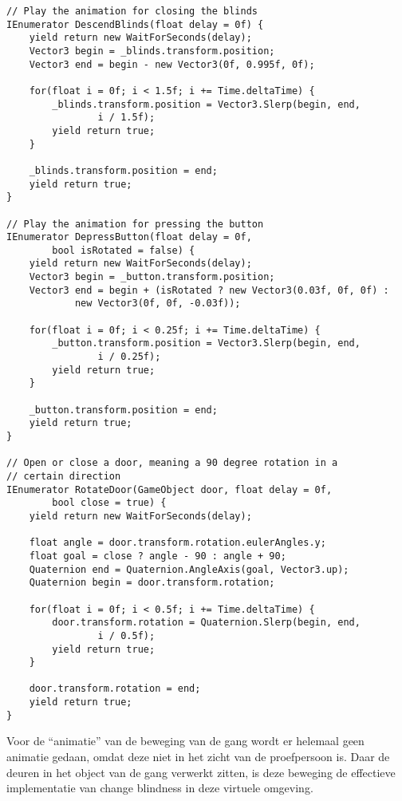 \begin{verbatim}
// Play the animation for closing the blinds
IEnumerator DescendBlinds(float delay = 0f) {
    yield return new WaitForSeconds(delay);
    Vector3 begin = _blinds.transform.position;
    Vector3 end = begin - new Vector3(0f, 0.995f, 0f);

    for(float i = 0f; i < 1.5f; i += Time.deltaTime) {
        _blinds.transform.position = Vector3.Slerp(begin, end, 
                i / 1.5f);
        yield return true;
    }

    _blinds.transform.position = end;
    yield return true;
}

// Play the animation for pressing the button
IEnumerator DepressButton(float delay = 0f, 
        bool isRotated = false) {
    yield return new WaitForSeconds(delay);
    Vector3 begin = _button.transform.position;
    Vector3 end = begin + (isRotated ? new Vector3(0.03f, 0f, 0f) : 
            new Vector3(0f, 0f, -0.03f));

    for(float i = 0f; i < 0.25f; i += Time.deltaTime) {
        _button.transform.position = Vector3.Slerp(begin, end, 
                i / 0.25f);
        yield return true;
    }

    _button.transform.position = end;
    yield return true;
}

// Open or close a door, meaning a 90 degree rotation in a 
// certain direction
IEnumerator RotateDoor(GameObject door, float delay = 0f, 
        bool close = true) {
    yield return new WaitForSeconds(delay);

    float angle = door.transform.rotation.eulerAngles.y;
    float goal = close ? angle - 90 : angle + 90;
    Quaternion end = Quaternion.AngleAxis(goal, Vector3.up);
    Quaternion begin = door.transform.rotation;

    for(float i = 0f; i < 0.5f; i += Time.deltaTime) {
        door.transform.rotation = Quaternion.Slerp(begin, end, 
                i / 0.5f);
        yield return true;
    }

    door.transform.rotation = end;
    yield return true;
}
\end{verbatim}

Voor de ``animatie'' van de beweging van de gang wordt er helemaal geen animatie
gedaan, omdat deze niet in het zicht van de proefpersoon is. Daar de deuren in
het object van de gang verwerkt zitten, is deze beweging de effectieve
implementatie van change blindness in deze virtuele omgeving.

